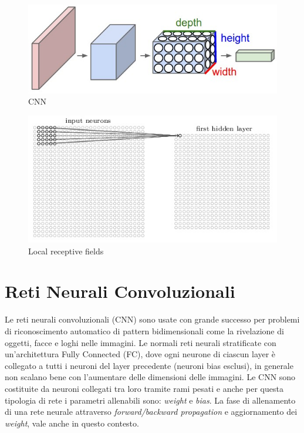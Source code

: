 \documentclass[twoside,twocolumn,10pt]{extarticle}
\theoremstyle{definition}
\begin{document}
\begin{figure}[h]
	\centering
	\includegraphics[scale=.5]{images/cnn.jpeg}
	\caption{CNN}
	\label{fig:cnn}
\end{figure}

\begin{figure}[h]
	\centering
	\includegraphics[scale=.5]{images/hlayer.jpeg}
	\caption{Local receptive fields}
	\label{fig:hlayer}
\end{figure}

\section{Reti Neurali Convoluzionali}\label{sec:cnn}
Le reti neurali convoluzionali (CNN) sono usate con grande successo per problemi di riconoscimento automatico di pattern bidimensionali come la rivelazione di oggetti, facce e loghi nelle immagini. Le normali reti neurali stratificate con un'architettura Fully Connected (FC), dove ogni neurone di ciascun layer è collegato a tutti i neuroni del layer precedente (neuroni bias esclusi), in generale non scalano bene con l'aumentare delle dimensioni delle immagini. Le CNN sono costituite da neuroni collegati tra loro tramite rami pesati e anche per questa tipologia di rete i parametri allenabili sono: \textit{weight} e \textit{bias}. La fase di allenamento di una rete neurale attraverso \textit{forward/backward propagation} e aggiornamento dei \textit{weight}, vale anche in questo contesto. 
\end{document}
